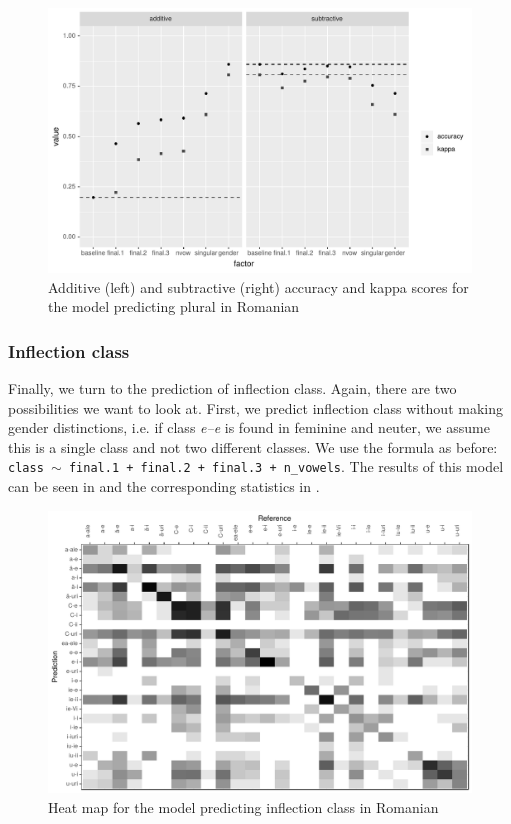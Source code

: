 \begin{figure}
  \centering
  \includegraphics[width=1.0\textwidth]{./figures/romanian/plural-overall.pdf}
  \caption{Additive (left) and subtractive (right) accuracy and kappa scores for the model predicting plural in Romanian}\label{fig:romanian-eval-pl}
\end{figure}

\subsubsection{Inflection class}

Finally, we turn to the prediction of inflection class. Again, there are two possibilities we want to look at. First, we predict inflection class without making gender distinctions, i.e. if class \textit{e--e} is found in feminine and neuter, we assume this is a single class and not two different classes. We use the formula as before: \texttt{class $\sim$ final.1 + final.2 + final.3 + n\_vowels}. The results of this model can be seen in  and the corresponding statistics in .

\begin{figure}
  \centering
  \includegraphics[width=1.0\textwidth]{./figures/romanian/class-1-cm.pdf}
  \caption{Heat map for the model predicting inflection class in Romanian}\label{fig:class-1-cm-romanian}
\end{figure}


